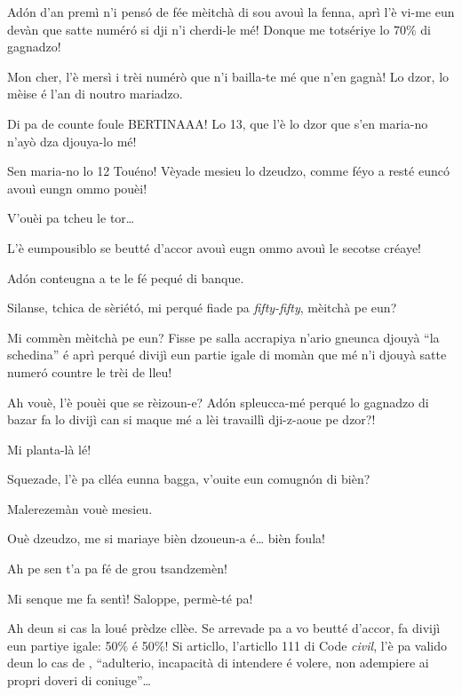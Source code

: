 \begin{drama}
\Tobiespeaks Adón d’an premì n’i pensó de fée mèitchà di sou avouì la fenna, aprì l’è vi-me eun devàn que satte numér\'o si dji n’i cherdi-le mé! Donque me totsériye lo 70$\%$ di gagnadzo!

\Bertinaspeaks Mon cher, l’è mersì i trèi numérò que n’i bailla-te mé que n’en gagnà! Lo dzor, lo mèise é l’an di noutro mariadzo.

\Tobiespeaks Di pa de counte foule BERTINAAA! Lo 13, que l’è lo dzor que s’en maria-no n’ayò dza djouya-lo mé!

\Bertinaspeaks Sen maria-no lo 12 Touéno!  Vèyade mesieu lo dzeudzo, comme féyo a resté eunc\'o avouì eungn ommo pouèi!

\DzeudzoSenliquerspeaks V'ouèi pa tcheu le tor\ldots

\Bertinaspeaks L’è eumpousiblo se beutté d’accor avouì eugn ommo avouì le secotse créaye!

\Tobiespeaks Adón conteugna a te le fé pequé di banque.

\DzeudzoSenliquerspeaks {} Silanse, tchica de sèriét\'o, mi perqué fiade pa \textit{fifty-fifty}, mèitchà pe eun?

\Tobiespeaks Mi commèn mèitchà pe eun? Fisse pe salla accrapiya n’ario gneunca djouyà ``la schedina'' é aprì perqué divijì eun partie igale di momàn que mé n'i djouyà satte numer\'o countre le trèi de lleu!

\Bertinaspeaks Ah vouè, l’è pouèi que se rèizoun-e? Ad\'on spleucca-mé perqué lo gagnadzo di bazar fa lo divijì can si maque mé a lèi travaillì dji-z-aoue pe dzor?!

\Tobiespeaks Mi planta-là lé!

\DzeudzoSenliquerspeaks {} Squezade, l’è pa clléa eunna bagga, v'ouite eun comugnón di bièn?

\Tobiespeaks Malerezemàn vouè mesieu.

\Bertinaspeaks Ouè dzeudzo, me si mariaye bièn dzoueun-a é\ldots {} bièn foula!

\Tobiespeaks Ah pe sen t’a pa fé de grou tsandzemèn!

\Bertinaspeaks Mi senque me fa sentì! Saloppe, permè-té pa!

\DzeudzoSenliquerspeaks {} Ah deun si cas la loué prèdze cllèe. Se arrevade pa a vo beutté d’accor, fa divijì eun partiye igale: 50$\%$ é 50$\%$! Si articllo, l’articllo 111 di Code \textit{civil}, l’è pa valido deun lo cas de , ``adulterio, incapacità di intendere é volere, non adempiere ai propri doveri di coniuge''\ldots


\end{drama}
